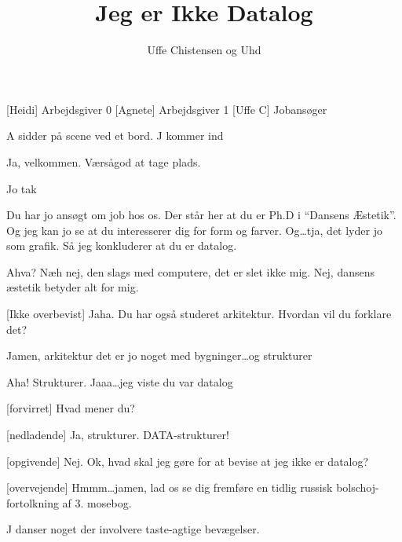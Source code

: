 \documentclass[a4paper,11pt]{article}
\title{Jeg er Ikke Datalog}
\author{Uffe Chistensen og Uhd}
\begin{document}
\maketitle

\begin{roles}
  [Heidi] Arbejdsgiver 0
  [Agnete] Arbejdsgiver 1
  [Uffe C] Jobansøger
\end{roles}

\begin{props}
\end{props}

\begin{sketch}
  
  \scene A sidder på scene ved et bord. J kommer ind

   Ja, velkommen. Værsågod at tage plads.
  
   Jo tak
  
   Du har jo ansøgt om job hos os. Der står her  at du er Ph.D i ``Dansens Æstetik''. Og jeg kan
  jo se at du interesserer dig for form og farver. Og\ldots tja, det
  lyder jo som grafik. Så jeg konkluderer at du er datalog.
  
   Ahva? Næh nej, den slags med computere, det er slet ikke
  mig. Nej, dansens æstetik betyder alt for mig.
  
  [Ikke overbevist] Jaha. Du har også studeret arkitektur.
  Hvordan vil du forklare det?
  
   Jamen, arkitektur det er jo noget med bygninger\ldots og
  strukturer
  
   Aha! Strukturer. Jaaa\ldots jeg viste du
  var datalog
  
  [forvirret] Hvad mener du?
  
  [nedladende] Ja, strukturer. DATA-strukturer!
  
  [opgivende] Nej. Ok, hvad skal jeg gøre for at bevise at jeg
  ikke er datalog?
  
  [overvejende] Hmmm\ldots jamen, lad os se dig fremføre en
  tidlig russisk bolschoj-fortolkning af 3. mosebog.
  
  \scene J danser noget der involvere taste-agtige bevægelser.
  

\end{sketch}
\end{document}
